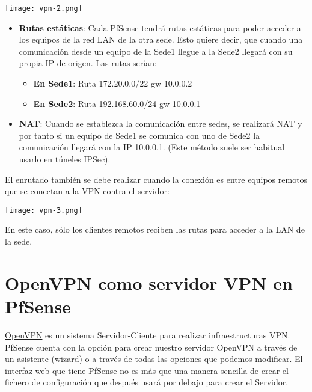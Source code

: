 \begin{center}
    \texttt{[image: vpn-2.png]}
\end{center}



\begin{itemize}
    \item \textbf{Rutas estáticas}: Cada PfSense tendrá rutas estáticas para poder acceder a los equipos de la red LAN de la otra sede. Esto quiere decir, que cuando una comunicación desde un equipo de la Sede1 llegue a la Sede2 llegará con su propia IP de origen. Las rutas serían:

    \begin{itemize}
        \item \textbf{En Sede1}: Ruta 172.20.0.0/22 gw 10.0.0.2
        \item \textbf{En Sede2}: Ruta 192.168.60.0/24 gw 10.0.0.1
    \end{itemize}

    \item \textbf{NAT}: Cuando se establezca la comunicación entre sedes, se realizará NAT y por tanto si un equipo de Sede1 se comunica con uno de Sede2 la comunicación llegará con la IP 10.0.0.1. (Este método suele ser habitual usarlo en túneles IPSec).
\end{itemize}


El enrutado también se debe realizar cuando la conexión es entre equipos remotos que se conectan a la VPN contra el servidor:

\begin{center}
    \texttt{[image: vpn-3.png]}
\end{center}

En este caso, sólo los clientes remotos reciben las rutas para acceder a la LAN de la sede.


\section{OpenVPN como servidor VPN en PfSense}
\href{https://openvpn.net/community/}{OpenVPN} es un sistema Servidor-Cliente para realizar infraestructuras VPN. PfSense cuenta con la opción para crear nuestro servidor OpenVPN a través de un asistente (wizard) o a través de todas las opciones que podemos modificar. El interfaz web que tiene PfSense no es más que una manera sencilla de crear el fichero de configuración que después usará por debajo para crear el Servidor.

